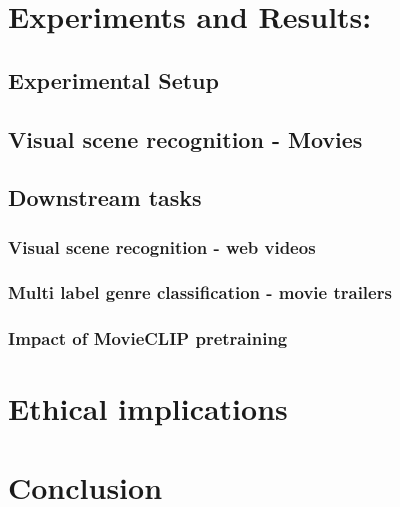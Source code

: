 \section{Experiments and Results:}
\subsection{Experimental Setup}
\subsection{Visual scene recognition - Movies}
\subsection{Downstream tasks}
\subsubsection{Visual scene recognition - web videos}
\subsubsection{Multi label genre classification - movie trailers}
\subsubsection{Impact of MovieCLIP pretraining}
\section{Ethical implications}
\section{Conclusion}


    
\Blindtext[2]

